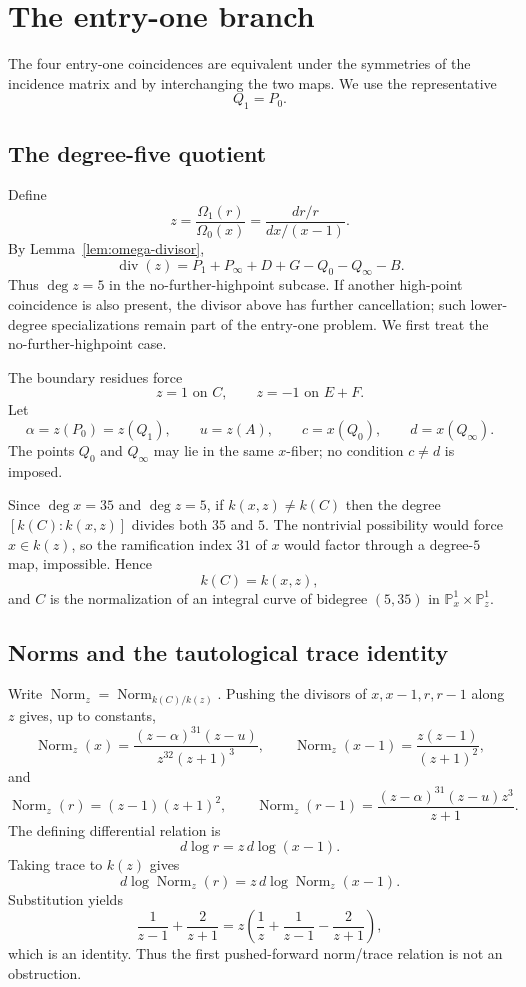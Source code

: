 \documentclass[11pt]{amsart}
\newcommand{\PP}{\mathbb P}
\newcommand{\Div}{\operatorname{div}}
\newcommand{\Norm}{\operatorname{Norm}}
\begin{document}
\section{The entry-one branch}
\label{sec:entry-one}

The four entry-one coincidences are equivalent under the symmetries of the
incidence matrix and by interchanging the two maps.  We use the representative
\[
  Q_1=P_0.
\]

\subsection{The degree-five quotient}

Define
\[
  z=\frac{\Omega_1(r)}{\Omega_0(x)}
   =\frac{dr/r}{dx/(x-1)}.
\]
By Lemma~\ref{lem:omega-divisor},
\[
  \Div(z)=P_1+P_\infty+D+G-Q_0-Q_\infty-B.
\]
Thus \(\deg z=5\) in the no-further-highpoint subcase.  If another high-point
coincidence is also present, the divisor above has further cancellation; such
lower-degree specializations remain part of the entry-one problem.  We first
treat the no-further-highpoint case.

The boundary residues force
\[
  z=1\text{ on }C,\qquad z=-1\text{ on }E+F.
\]
Let
\[
  \alpha=z(P_0)=z(Q_1),\qquad u=z(A),\qquad
  c=x(Q_0),\qquad d=x(Q_\infty).
\]
The points \(Q_0\) and \(Q_\infty\) may lie in the same \(x\)-fiber; no
condition \(c\ne d\) is imposed.

Since \(\deg x=35\) and \(\deg z=5\), if \(k(x,z)\ne k(C)\) then the degree
\([k(C):k(x,z)]\) divides both \(35\) and \(5\).  The nontrivial possibility
would force \(x\in k(z)\), so the ramification index \(31\) of \(x\) would
factor through a degree-\(5\) map, impossible.  Hence
\[
  k(C)=k(x,z),
\]
and \(C\) is the normalization of an integral curve of bidegree \((5,35)\)
in \(\PP^1_x\times\PP^1_z\).

\subsection{Norms and the tautological trace identity}

Write \(\Norm_z=\Norm_{k(C)/k(z)}\).  Pushing the divisors of
\(x,x-1,r,r-1\) along \(z\) gives, up to constants,
\[
  \Norm_z(x)=\frac{(z-\alpha)^{31}(z-u)}{z^{32}(z+1)^3},
\qquad
  \Norm_z(x-1)=\frac{z(z-1)}{(z+1)^2},
\]
and
\[
  \Norm_z(r)=(z-1)(z+1)^2,\qquad
  \Norm_z(r-1)=\frac{(z-\alpha)^{31}(z-u)z^3}{z+1}.
\]
The defining differential relation is
\[
  d\log r=z\,d\log(x-1).
\]
Taking trace to \(k(z)\) gives
\[
  d\log\Norm_z(r)=z\,d\log\Norm_z(x-1).
\]
Substitution yields
\[
  \frac1{z-1}+\frac2{z+1}
  =
  z\left(\frac1z+\frac1{z-1}-\frac2{z+1}\right),
\]
which is an identity.  Thus the first pushed-forward norm/trace relation is
not an obstruction.
\end{document}
